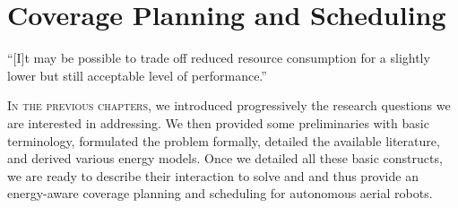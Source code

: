 
%
%
%
%
\chapter{Coverage Planning and Scheduling}
\label{cp:dyn}

\begin{chapquote}{\cite{lahijanian2018resource}}
  ``[I]t may be possible to trade off reduced resource consumption for a slightly lower but still acceptable level of performance.''
\end{chapquote}

\vspace*{1em}

\lettrine{I}{n the previous chapters}, we introduced progressively the research questions we are interested in addressing. We then provided some preliminaries with basic terminology, formulated the problem formally, detailed the available literature, and derived various energy models. Once we detailed all these basic constructs, we are ready to describe their interaction to solve  and  and thus provide an energy-aware coverage planning and scheduling for autonomous aerial robots.

